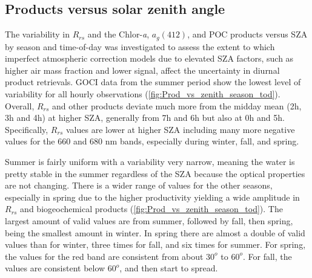 \documentclass[onecolumn,3p,letterpaper,11pt]{elsarticle}
\begin{document}
\subsection{Products versus solar zenith angle}
The variability in $R_{rs}$ and the Chlor-{\it a}, $a_g(412)$, and POC products versus SZA by season and time-of-day was investigated to assess the extent to which imperfect atmospheric correction models due to elevated SZA factors, such as higher air mass fraction and lower signal, affect the uncertainty in diurnal product retrievals.  GOCI data from the summer period show the lowest level of variability for all hourly observations (\autoref{fig:Prod_vs_zenith_season_tod}).  Overall, $R_{rs}$ and other products deviate much more from the midday mean (2h, 3h and 4h) at higher SZA, generally from 7h and 6h but also at 0h and 5h. Specifically, $R_{rs}$ values are lower at higher SZA including many more negative values for the 660 and 680 nm bands, especially during winter, fall, and spring.

Summer is fairly uniform with a variability very narrow, meaning the water is pretty stable in the summer regardless of the SZA because the optical properties are not changing. 
There is a wider range of values for the other seasons, especially in spring due to the higher productivity yielding a wide amplitude in $R_{rs}$ and biogeochemical products (\autoref{fig:Prod_vs_zenith_season_tod}). 
The largest amount of valid values are from summer, followed by fall, then spring, being the smallest amount in winter.
In spring there are almost a double of valid values than for winter, three times for fall, and six times for summer.
For spring, the values for the red band are consistent from about $30^o$ to $60^o$.
For fall, the values are consistent below $60^o$, and then start to spread.
\end{document}
